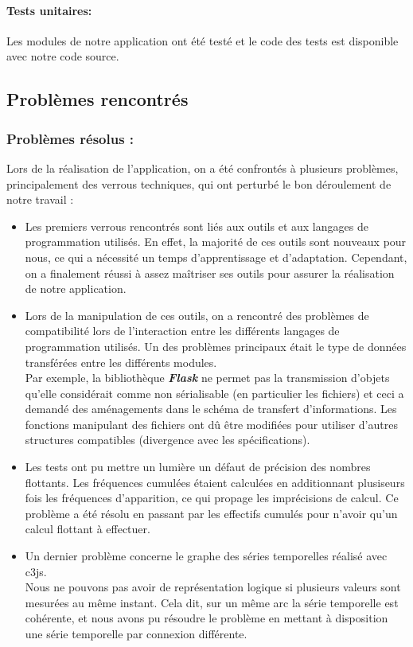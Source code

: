 		\paragraph{Tests unitaires:}Les modules de notre application ont été testé et le code des tests est disponible avec notre code source.
		
		\subsection{Problèmes rencontrés}
			\subsubsection*{Problèmes résolus :} 
			Lors de la réalisation de l'application, on a été confrontés à plusieurs problèmes, principalement des verrous techniques, qui ont perturbé le bon déroulement de notre travail :
			\begin{itemize}[leftmargin=*]
				\item Les premiers verrous rencontrés sont liés aux outils et aux langages de programmation utilisés. En effet, la majorité de ces outils sont nouveaux pour nous, ce qui a nécessité un temps d'apprentissage et d'adaptation. Cependant, on a finalement réussi à assez maîtriser ses outils pour assurer la réalisation de notre application.
				\item Lors de la manipulation de ces outils, on a rencontré des problèmes de compatibilité lors de l'interaction entre les différents langages de programmation utilisés. Un des problèmes principaux était le type de données transférées entre les différents modules.\\
					Par exemple, la bibliothèque \textit{\textbf{Flask}} ne permet pas la transmission d'objets qu'elle considérait comme non sérialisable (en particulier les fichiers) et ceci a demandé des aménagements dans le schéma de transfert d'informations. Les fonctions manipulant des fichiers ont dû être modifiées pour utiliser d'autres structures compatibles (divergence avec les spécifications).
				\item Les tests ont pu mettre un lumière un défaut de précision des nombres flottants. Les fréquences cumulées étaient calculées en additionnant plusiseurs fois les fréquences d'apparition, ce qui propage les imprécisions de calcul.  Ce problème a été résolu en passant par les effectifs cumulés pour n'avoir qu'un calcul flottant à effectuer.
				\item Un dernier problème concerne le graphe des séries temporelles réalisé avec c3js.\\
					Nous ne pouvons pas avoir de représentation logique si plusieurs valeurs sont mesurées au même instant. Cela dit, sur un même arc la série temporelle est cohérente, et nous avons pu résoudre le problème en mettant à disposition une série temporelle par connexion différente.
			\end{itemize}
				

